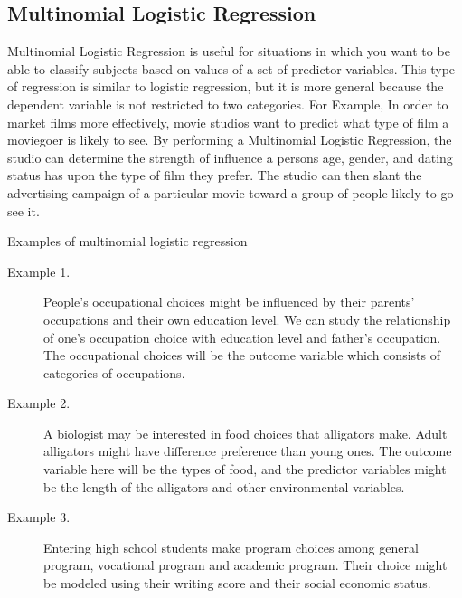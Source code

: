 \documentclass[a4paper,12pt]{article}
\begin{document}
\subsection{Multinomial Logistic Regression}
Multinomial Logistic Regression is useful for situations in which you want to be able to classify
subjects based on values of a set of predictor variables. This type of regression is similar to logistic
regression, but it is more general because the dependent variable is not restricted to two categories.
For Example, In order to market films more effectively, movie studios want to predict what type of
film a moviegoer is likely to see. By performing a Multinomial Logistic Regression, the studio
can determine the strength of influence a persons age, gender, and dating status has upon the type
of film they prefer. The studio can then slant the advertising campaign of a particular movie
toward a group of people likely to go see it.
\newpage

Examples of multinomial logistic regression

\begin{description}
	\item[Example 1.] People's occupational choices might be influenced by their parents' occupations and their own education level. We can study the relationship of one's occupation choice with education level and father's occupation.  The occupational choices will be the outcome variable which consists of categories of occupations.
	
	\item[Example 2.] A biologist may be interested in food choices that alligators make. Adult alligators might have difference preference than young ones. The outcome variable here will be the types of food, and the predictor variables might be the length of the alligators and other environmental variables.
	
	\item[Example 3.] Entering high school students make program choices among general program, vocational program and academic program. Their choice might be modeled using their writing score and their social economic status.
\end{description}
\end{document}
